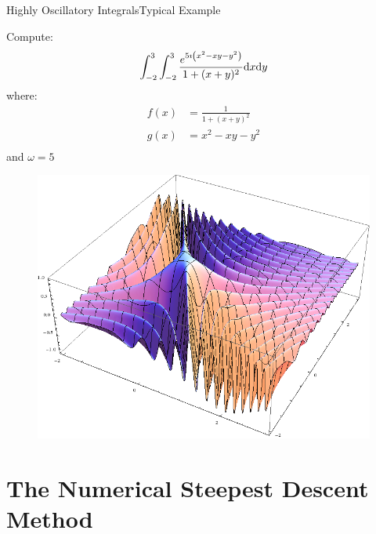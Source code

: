 \documentclass{beamer}
\begin{document}
\begin{frame}{Highly Oscillatory Integrals}{Typical Example}
  \begin{minipage}{0.5\linewidth}
    Compute:
    \begin{equation*}
      \int_{-2}^3 \int_{-2}^3 \frac{e^{5 \imath \left(x^2-x y-y^2\right)}}{1 + (x+y)^2} \mathrm{d}x \mathrm{d}y
    \end{equation*}
    where:
    \begin{align*}
      f(x) & = \frac{1}{1 + (x+y)^2} \\
      g(x) & = x^2 - x y - y^2 \\
    \end{align*}
    and $\omega = 5$
  \end{minipage}
  \begin{minipage}{0.48\linewidth}
    \begin{figure}
      \centering
      \includegraphics[width=\linewidth]{./fig/oscillatory_example_2d.png}
    \end{figure}
  \end{minipage}
\end{frame}


\section{The Numerical Steepest Descent Method}
\end{document}
